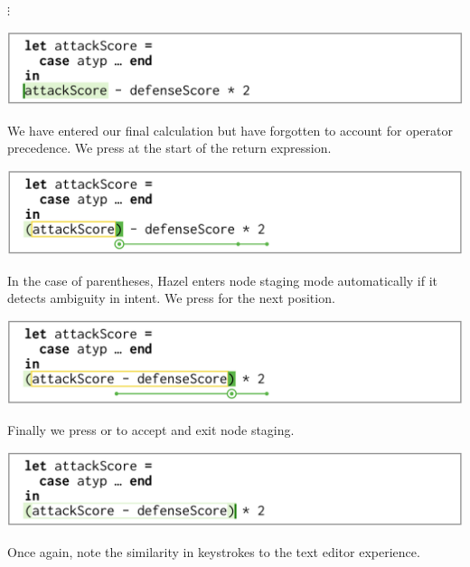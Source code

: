 \documentclass[format=sigplan,dvipsnames,backend=bibtex]{acmart}
\newcommand{\Hazel}{\textsf{Hazel}\xspace}
\newcommand{\key}[1]{\fbox{\texttt{#1}}}
\begin{document}
{\centering
	\vspace{-0.1cm}
  $\vdots$\par
  \vspace{0.1cm}
}
\noindent

{\centering
  \includegraphics[width=\linewidth]{fig/frame10.png}\par
}
\noindent
We have entered our final calculation but have forgotten to account for operator precedence.
We press \key{(} at the start of the return expression.

{\centering
  \includegraphics[width=\linewidth]{fig/frame11.png}\par
}
\noindent
In the case of parentheses, \Hazel enters node staging mode automatically if it detects
	ambiguity in intent.
We press \key{$\rightarrow$} for the next position.

{\centering
  \includegraphics[width=\linewidth]{fig/frame12.png}\par
}
\noindent
Finally we press \key{Enter} or \key{)} to accept and exit node staging. 

{\centering
  \includegraphics[width=\linewidth]{fig/frame13.png}\par
}
\noindent
Once again,
note the similarity in keystrokes to the text editor experience.

\newpage

\end{document}
